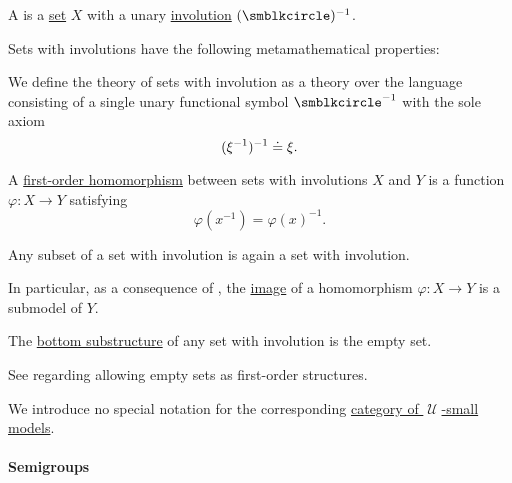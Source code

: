 \begin{definition}\label{def:set_with_involution}\mimprovised
  A  is a \hyperref[def:set]{set} \( X \) with a unary \hyperref[def:involution]{involution} \( (\anon)^{-1} \).

  Sets with involutions have the following metamathematical properties:
  \begin{thmenum}
     We define the theory of sets with involution as a theory over the language consisting of a single unary functional symbol \( \anon^{-1} \) with the sole axiom
    \begin{equation}\label{eq:def:set_with_involution/theory/axiom}
      (\xi^{-1})^{-1} \doteq \xi.
    \end{equation}

     A \hyperref[def:first_order_homomorphism]{first-order homomorphism} between sets with involutions \( X \) and \( Y \) is a function \( \varphi: X \to Y \) satisfying
    \begin{equation}\label{eq:def:set_with_involution/homomorphism}
      \varphi(x^{-1})
      =
      \varphi(x)^{-1}.
    \end{equation}

     Any subset of a set with involution is again a set with involution.

    In particular, as a consequence of , the \hyperref[def:set_valued_map/image]{image} of a homomorphism \( \varphi: X \to Y \) is a submodel of \( Y \).

    The \hyperref[thm:substructures_form_complete_lattice/bottom]{bottom substructure} of any set with involution is the empty set.

    See  regarding allowing empty sets as first-order structures.

     We introduce no special notation for the corresponding \hyperref[def:category_of_small_first_order_models]{category of \( \mscrU \)-small models}.
  \end{thmenum}
\end{definition}

\paragraph{Semigroups}

